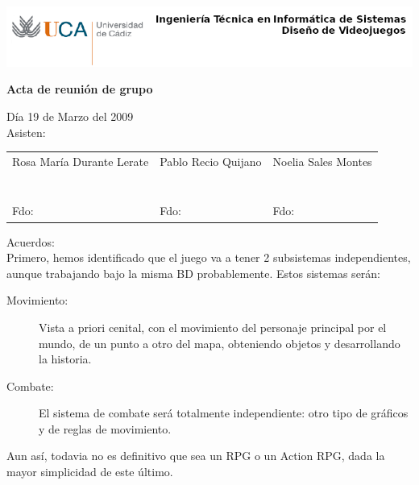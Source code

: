 \documentclass[a4paper,10pt]{article}
\begin{document}
\includegraphics[scale=0.6]{../uca.png}

\begin{center}
  \noindent \huge\textbf{ Acta de reunión de grupo}\\
\end{center}

\noindent Día 19 de Marzo del 2009\\

\noindent Asisten:

\begin{center}
\begin{tabular}{|m{5.2cm}|m{5.2cm}|m{5.2cm}|}
  \hline
  Rosa María Durante Lerate & Pablo Recio Quijano & Noelia Sales Montes\\
  & & \\
  & & \\
  & & \\
  & & \\
  & & \\
  & & \\
  & & \\
  Fdo: & Fdo: & Fdo: \\
  \hline
\end{tabular}
\end{center}

\noindent Acuerdos:\\

\noindent Primero, hemos identificado que el juego va a tener 2
subsistemas independientes, aunque trabajando bajo la misma BD
probablemente. Estos sistemas serán:

\begin{description}
\item[Movimiento: ] Vista a priori cenital, con el movimiento del
  personaje principal por el mundo, de un punto a otro del mapa,
  obteniendo objetos y desarrollando la historia.
\item[Combate: ] El sistema de combate será totalmente independiente:
  otro tipo de gráficos y de reglas de movimiento.
\end{description}

\noindent Aun así, todavia no es definitivo que sea un RPG o un Action
RPG, dada la mayor simplicidad de este último.\\
\end{document}
